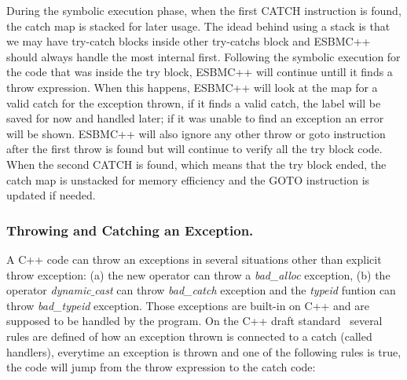 \documentclass[a4paper]{llncs}
\begin{document}
During the symbolic execution phase, when the first 
CATCH instruction is found, the catch map is stacked 
for later usage. The idead behind using a stack is 
that we may have try-catch blocks inside other 
try-catchs block and ESBMC++ should always handle 
the most internal first. Following the symbolic execution 
for the code that was inside the try block, ESBMC++ will continue 
untill it finds a throw expression. When this happens, ESBMC++ will 
look at the map for a valid catch for the exception thrown, if it finds 
a valid catch, the label will be saved for now and handled later; 
if it was unable to find an exception an error will be shown.
ESBMC++ will also ignore any other throw or goto instruction after 
the first throw is found but will continue to verify all the try 
block code. When the second CATCH is found, which means that the try 
block ended, the catch map is unstacked for memory efficiency 
and the GOTO instruction is updated if needed.

\subsubsection{Throwing and Catching an Exception.}
A C++ code can throw an exceptions in several situations other 
than explicit throw exception: (a) the new operator can throw a \textit{bad\_alloc}
exception, (b) the operator \textit{dynamic$\_$cast} can throw \textit{bad\_catch} 
exception and the \textit{typeid} funtion can throw \textit{bad\_typeid} exception. 
Those exceptions are built-in on C++ and are supposed to be handled by the program.
On the C++ draft standard~\cite{CppDraft} several rules are defined of how an exception 
thrown is connected to a catch (called handlers), everytime an exception is thrown and 
one of the following rules is true, the code will jump from the throw expression to the catch code:
\end{document}
